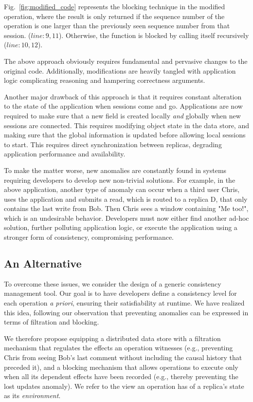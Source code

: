 Fig.~\ref{fig:modified_code} represents the blocking technique in the
modified \readC{} operation, where the result is only returned if the
sequence number of the operation is one larger than the previously
seen sequence number from that session.  ($line:9,11$). Otherwise, the
function is blocked by calling itself recursively ($line:10,12$).


The above approach obviously requires fundamental and pervasive
changes to the original code.  Additionally, modifications are heavily
tangled with application logic complicating reasoning and hampering
correctness arguments.

Another major drawback of this approach is that it requires constant
alteration to the state of the application when sessions come and go.
Applications are now required to make sure that a new field is created
locally \emph{and} globally when new sessions are connected. This
requires modifying object state in the data store, and making sure
that the global information is updated before allowing local sessions
to start. This requires direct synchronization between replicas,
degrading application performance and availability.

To make the matter worse, new anomalies are constantly found in
systems requiring developers to develop new non-trivial solutions. For
example, in the above application, another type of anomaly can occur
when a third user Chris, uses the application and submits a read,
which is routed to a replica D, that only contains the last write from
Bob. Then Chris sees a window containing "Me too!", which is an
undesirable behavior.  Developers must now either find another ad-hoc
solution, further polluting application logic, or execute the
application using a stronger form of consistency, compromising
performance.

%
%
\subsection{An Alternative}

To overcome these issues, we consider the design of a generic
consistency management tool.  Our goal is to have developers define a
consistency level for each operation \emph{a priori}, ensuring their
satisfiability at runtime. We have realized this idea, following our
observation that preventing anomalies can be expressed in terms of
filtration and blocking.

We therefore propose equipping a distributed data store with a
filtration mechanism that regulates the effects an operation witnesses
(e.g., preventing Chris from seeing Bob's last comment without
including the causal history that preceded it), and a blocking
mechanism that allows operations to execute only when all its
dependent effects have been recorded (e.g., thereby preventing the
lost updates anomaly).  We refer to the view an operation has of a
replica's state as its \emph{environment}.

